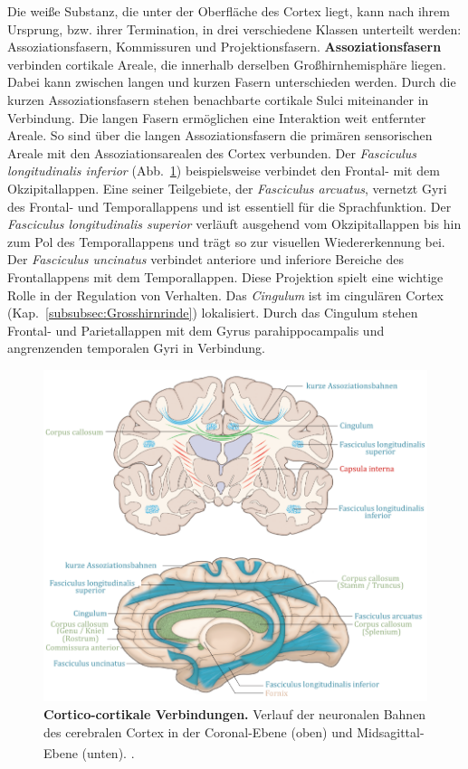 \documentclass[12pt,a4paper,pdftex]{article}
\begin{document}
Die weiße Substanz, die unter der Oberfläche des Cortex liegt, kann nach ihrem Ursprung, bzw. ihrer Termination, in drei verschiedene Klassen unterteilt werden: Assoziationsfasern, Kommissuren und Projektionsfasern.
\textbf{Assoziationsfasern} verbinden cortikale Areale, die innerhalb derselben Großhirnhemisphäre liegen. Dabei kann zwischen langen und kurzen Fasern unterschieden werden. Durch die kurzen Assoziationsfasern stehen benachbarte cortikale Sulci miteinander in Verbindung. Die langen Fasern ermöglichen eine Interaktion weit entfernter Areale. So sind über die langen Assoziationsfasern die primären sensorischen Areale mit den Assoziationsarealen des Cortex verbunden. Der \textit{Fasciculus longitudinalis inferior} (Abb.~\ref{fig:cortico-cortical}) beispielsweise verbindet den Frontal- mit dem Okzipitallappen. Eine seiner Teilgebiete, der \textit{Fasciculus arcuatus}, vernetzt Gyri des Frontal- und Temporallappens und ist essentiell für die Sprachfunktion. Der \textit{Fasciculus longitudinalis superior} verläuft ausgehend vom Okzipitallappen bis hin zum Pol des Temporallappens und trägt so zur visuellen Wiedererkennung bei. Der \textit{Fasciculus uncinatus} verbindet anteriore und inferiore Bereiche des Frontallappens mit dem Temporallappen. Diese Projektion spielt eine wichtige Rolle in der Regulation von Verhalten. Das \textit{Cingulum} ist im cingulären Cortex (Kap.~\ref{subsubsec:Grosshirnrinde}) lokalisiert. Durch das Cingulum stehen Frontal- und Parietallappen mit dem Gyrus parahippocampalis und angrenzenden temporalen Gyri in Verbindung.

\begin{figure}[H]
    \centering
    \includegraphics[width=\textwidth]{pictures/Bilder_Jule/Andere/cortico-cortical_(crossm13).png}
    \caption[Cortico-cortikale Verbindungen]{\textbf{Cortico-cortikale Verbindungen.} Verlauf der neuronalen Bahnen des cerebralen Cortex in der Coronal-Ebene (oben) und Midsagittal-Ebene (unten). \textsuperscript{\cite[13]{crossman2014neuroanatomy}}.}
    \label{fig:cortico-cortical}
\end{figure}{}
\end{document}
